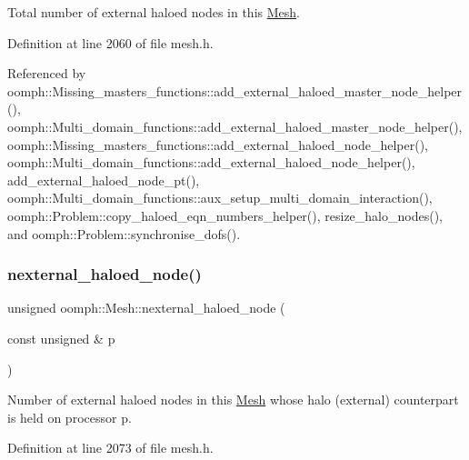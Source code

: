 Total number of external haloed nodes in this \hyperlink{classoomph_1_1Mesh}{Mesh}. 



Definition at line 2060 of file mesh.\+h.



Referenced by oomph\+::\+Missing\+\_\+masters\+\_\+functions\+::add\+\_\+external\+\_\+haloed\+\_\+master\+\_\+node\+\_\+helper(), oomph\+::\+Multi\+\_\+domain\+\_\+functions\+::add\+\_\+external\+\_\+haloed\+\_\+master\+\_\+node\+\_\+helper(), oomph\+::\+Missing\+\_\+masters\+\_\+functions\+::add\+\_\+external\+\_\+haloed\+\_\+node\+\_\+helper(), oomph\+::\+Multi\+\_\+domain\+\_\+functions\+::add\+\_\+external\+\_\+haloed\+\_\+node\+\_\+helper(), add\+\_\+external\+\_\+haloed\+\_\+node\+\_\+pt(), oomph\+::\+Multi\+\_\+domain\+\_\+functions\+::aux\+\_\+setup\+\_\+multi\+\_\+domain\+\_\+interaction(), oomph\+::\+Problem\+::copy\+\_\+haloed\+\_\+eqn\+\_\+numbers\+\_\+helper(), resize\+\_\+halo\+\_\+nodes(), and oomph\+::\+Problem\+::synchronise\+\_\+dofs().

\mbox{\label{classoomph_1_1Mesh_a65eb8d134e9758b28d7fdf178dfad727}} 
\subsubsection{\texorpdfstring{nexternal\+\_\+haloed\+\_\+node()}{nexternal\_haloed\_node()}\hspace{0.1cm}{\footnotesize\ttfamily [2/2]}}
{\footnotesize\ttfamily unsigned oomph\+::\+Mesh\+::nexternal\+\_\+haloed\+\_\+node (\begin{DoxyParamCaption}\item[{const unsigned \&}]{p }\end{DoxyParamCaption})\hspace{0.3cm}{\ttfamily [inline]}}



Number of external haloed nodes in this \hyperlink{classoomph_1_1Mesh}{Mesh} whose halo (external) counterpart is held on processor p. 



Definition at line 2073 of file mesh.\+h.

\mbox{\label{classoomph_1_1Mesh_aa19080c0e68facf0e8c8ec55b327279f}} 
